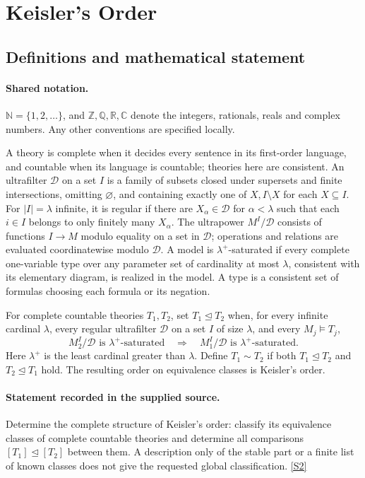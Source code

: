 \documentclass[11pt]{article}
\newcommand{\sref}[2]{\hyperlink{source:#1:#2}{[S#2]}}
\begin{document}
\section{Keisler's Order}\label{statement}

\subsection{Definitions and mathematical statement}

\paragraph{Shared notation.}$\mathbb N=\{1,2,\ldots\}$, and $\mathbb Z,\mathbb Q,\mathbb R,\mathbb C$ denote the integers, rationals, reals and complex numbers. Any other conventions are specified locally.


A theory is complete when it decides every sentence in its first-order language, and countable when its language is countable; theories here are consistent. An ultrafilter $\mathcal D$ on a set $I$ is a family of subsets closed under supersets and finite intersections, omitting $\varnothing$, and containing exactly one of $X,I\setminus X$ for each $X\subseteq I$. For $|I|=\lambda$ infinite, it is regular if there are $X_\alpha\in\mathcal D$ for $\alpha<\lambda$ such that each $i\in I$ belongs to only finitely many $X_\alpha$. The ultrapower $M^I/\mathcal D$ consists of functions $I\to M$ modulo equality on a set in $\mathcal D$; operations and relations are evaluated coordinatewise modulo $\mathcal D$. A model is $\lambda^+$-saturated if every complete one-variable type over any parameter set of cardinality at most $\lambda$, consistent with its elementary diagram, is realized in the model. A type is a consistent set of formulas choosing each formula or its negation.

For complete countable theories $T_1,T_2$, set $T_1\unlhd T_2$ when, for every infinite cardinal $\lambda$, every regular ultrafilter $\mathcal D$ on a set $I$ of size $\lambda$, and every $M_j\models T_j$,
\[
 M_2^I/\mathcal D\text{ is }\lambda^+\text{-saturated}
 \quad\Longrightarrow\quad
 M_1^I/\mathcal D\text{ is }\lambda^+\text{-saturated}.
\]
Here $\lambda^+$ is the least cardinal greater than $\lambda$. Define $T_1\sim T_2$ if both $T_1\unlhd T_2$ and $T_2\unlhd T_1$ hold. The resulting order on equivalence classes is Keisler's order.
\paragraph{Statement recorded in the supplied source.}
Determine the complete structure of Keisler's order: classify its equivalence classes of complete countable theories and determine all comparisons $[T_1]\unlhd[T_2]$ between them. A description only of the stable part or a finite list of known classes does not give the requested global classification. \sref{statement}{2}
\end{document}
